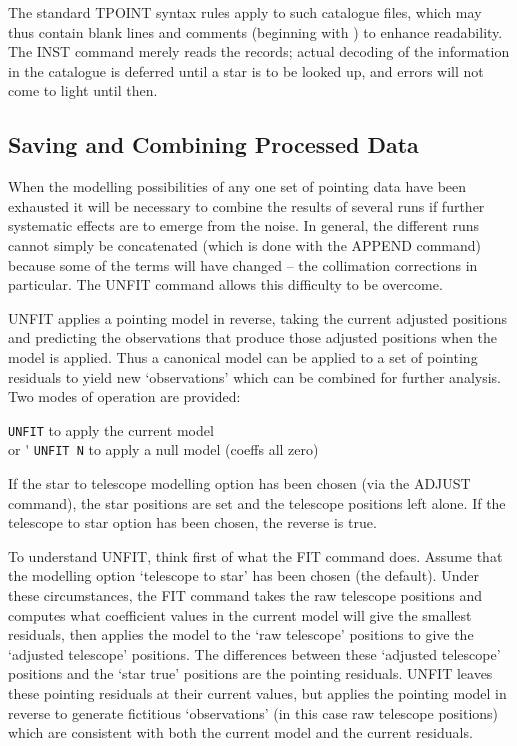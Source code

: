 The standard TPOINT syntax rules apply to such catalogue files,
which may thus contain blank lines and comments (beginning with 
\fstring{!}) to enhance readability.  The INST command merely
reads the records;  actual decoding of the
information in the catalogue is deferred until a star is to be
looked up, and errors will not come to light until then.

\subsection{Saving and Combining Processed Data}
When the modelling possibilities of any one set of pointing data
have been exhausted it will be necessary to combine the results
of several runs if further systematic effects are to emerge from
the noise.  In general, the different runs cannot simply be
concatenated (which is done with the APPEND command)
because some of the terms will have
changed -- the collimation corrections in particular.  The UNFIT
command allows this difficulty to be overcome.

UNFIT applies a pointing model in reverse,
taking the current adjusted positions and predicting
the observations that produce those adjusted positions
when the model is applied.  Thus
a canonical model can be
applied to a set of pointing residuals to yield new
`observations' which can be combined for further
analysis.  Two modes of operation are provided:
\begin{cmnds}
\> \> {\tt UNFIT} \> to apply the current model \\
\> or \'\> {\tt UNFIT N} \> to apply a null model (coeffs all zero)
\end{cmnds}
If the star to telescope modelling option has been chosen
(via the ADJUST command), the star positions are set and the
telescope positions left alone.  If the telescope to star
option has been chosen, the reverse is true.

To understand UNFIT, think first of what the FIT command
does.  Assume that the modelling option `telescope to star' has
been chosen (the default).  Under these circumstances,
the FIT command takes the raw telescope positions and
computes what coefficient values in the current model
will give the smallest residuals, then applies the model
to the `raw telescope' positions to give the `adjusted
telescope' positions.  The differences between these
`adjusted telescope' positions and the `star true'
positions are the pointing residuals.
UNFIT leaves these pointing residuals at their current
values, but applies the pointing model in reverse to
generate fictitious `observations' (in this case raw
telescope positions) which are consistent with both
the current model and the current residuals.

